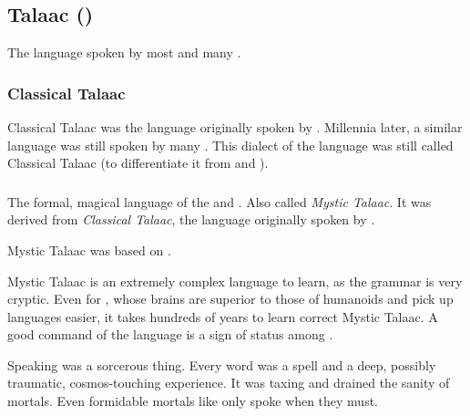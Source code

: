 \subsection{Talaac (\Draconic)}
The language spoken by most \dragons and many \ophidians. 








\subsubsection{Classical Talaac}
Classical Talaac was the language originally spoken by .
Millennia later, a similar language was still spoken by many \ophidians. 
This  dialect of the language was still called Classical Talaac (to differentiate it from  and ).





\subsubsection{\TrueDraconic}
\index{\TrueDraconic}
The formal, magical language of the \dragons and \ophidians.
Also called \emph{Mystic Talaac}. 
It was derived from \emph{Classical Talaac}, the language originally spoken by . 

Mystic Talaac was based on . 

Mystic Talaac is an extremely complex language to learn, as the grammar is very cryptic. 
Even for \dragons{}, whose brains are superior to those of humanoids and pick up languages easier, it takes hundreds of years to learn correct Mystic Talaac. 
A good command of the language is a sign of status among \dragons{}. 

Speaking \TrueDraconic was a sorcerous thing. 
Every word was a spell and a deep, possibly traumatic, cosmos-touching experience.
It was taxing and drained the sanity of mortals. 
Even formidable mortals like \Criseis only spoke \TrueDraconic when they must.

